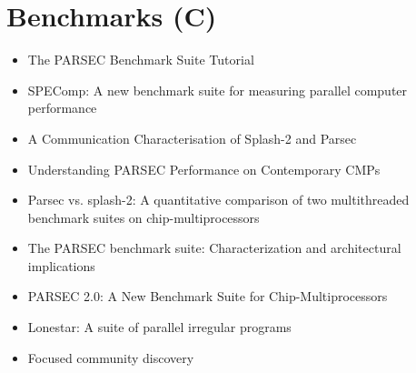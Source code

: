\section{Benchmarks (C)}
\label{sec:lr-benchmarks-c}

\begin{itemize}
\item The PARSEC Benchmark Suite Tutorial \cite{Bienia2009}
\item SPEComp: A new benchmark suite for measuring parallel computer
  performance \cite{Aslot2001}
\item A Communication Characterisation of Splash-2 and Parsec
  \cite{Barrow-Williams2009}
\item Understanding PARSEC Performance on Contemporary CMPs
  \cite{Bhadauria2009}
\item Parsec vs. splash-2: A quantitative comparison of two
  multithreaded benchmark suites on chip-multiprocessors
  \cite{Bienia2008}
\item The PARSEC benchmark suite: Characterization and architectural
  implications \cite{Bienia2008a}
\item PARSEC 2.0: A New Benchmark Suite for Chip-Multiprocessors
  \cite{Bienia2009a}
\item Lonestar: A suite of parallel irregular programs
  \cite{Kulkarni2009}
\item Focused community discovery \cite{Hildrum2005}
\end{itemize}


